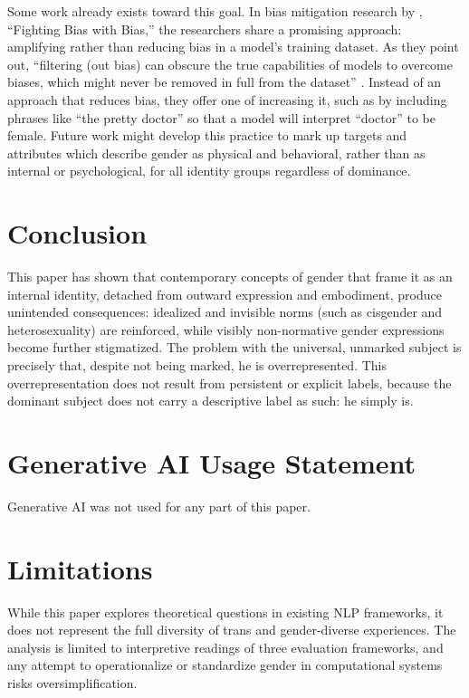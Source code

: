 \documentclass[anonymous,review]{acmart}
\begin{document}
Some work already exists toward this goal. In bias mitigation research by \citet{reif:2023}, “Fighting Bias with Bias,” the researchers share a promising approach: amplifying rather than reducing bias in a model’s training dataset. As they point out, “filtering (out bias) can obscure the true capabilities of models to overcome biases, which might never be removed in full from the dataset” \citep{reif:2023}. Instead of an approach that reduces bias, they offer one of increasing it, such as by including phrases like “the pretty doctor” so that a model will interpret “doctor” to be female. Future work might develop this practice to mark up targets and attributes which describe gender as physical and behavioral, rather than as internal or psychological, for all identity groups regardless of dominance.

\section{Conclusion}
This paper has shown that contemporary concepts of gender that frame it as an internal identity, detached from outward expression and embodiment, produce unintended consequences: idealized and invisible norms (such as cisgender and heterosexuality) are reinforced, while visibly non-normative gender expressions become further stigmatized. The problem with the universal, unmarked subject is precisely that, despite not being marked, he is overrepresented. This overrepresentation does not result from persistent or explicit labels, because the dominant subject does not carry a descriptive label as such: he simply is.

\section{Generative AI Usage Statement}

Generative AI was not used for any part of this paper.

\section*{Limitations}

While this paper explores theoretical questions in existing NLP frameworks, it does not represent the full diversity of trans and gender-diverse experiences. The analysis is limited to interpretive readings of three evaluation frameworks, and any attempt to operationalize or standardize gender in computational systems risks oversimplification.





\appendix
\end{document}
